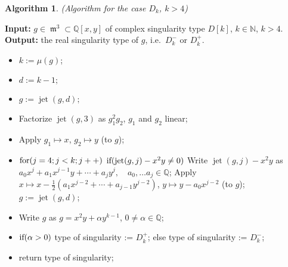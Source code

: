 \documentclass{amsproc}
\DeclareMathOperator{\m}{\mathfrak{m}}
\DeclareMathOperator{\jt}{jet}
\begin{document}
\newtheorem{D[k]k>4}[kjet]{Algorithm}
\begin{D[k]k>4}(Algorithm for the case $D_k$, $k>4$)
\end{D[k]k>4}
\noindent\textnormal{\bf Input:} $g\in \m^3\subset\mathbb Q[x,y]$ of complex
singularity type $D[k]$, $k\in\mathbb N$, $k>4$.\newline
\textnormal{\bf Output:} the real singularity type of $g$, i.e.~$D_k^-$
or $D_k^+$.
\begin{itemize}
\item $k:= \mu(g)$;
\item $d:=k-1;$
\item $g:=\jt(g,d);$
\item Factorize $\jt(g,3)$ as $g_1^2g_2$, $g_1$ and $g_2$ linear;
\item Apply $g_1\mapsto x$, $g_2\mapsto y$ (to $g$);
\item $\textnormal{for}(j=4; j<k; j++)$\newline
\phantom{}\quad $\textnormal{if}(\jt(g,j)-x^2y\neq0)$\newline
\phantom{}\quad\quad Write $\jt(g,j)-x^2y$ as
$a_0x^j+a_1x^{j-1}y+\cdots +a_jy^j,\quad a_0,\ldots a_j\in\mathbb Q$;\newline
\phantom{}\quad\quad Apply $x\mapsto x-\frac{1}{2}(a_1x^{j-2}+\cdots
+a_{j-1}y^{j-2})$, $y\mapsto y-a_0x^{j-2}$ (to $g$);\newline
\phantom{}\quad\quad $g:=\jt(g,d)$;\newline
\item Write $g$ as $g=x^2y+\alpha y^{k-1}$, $0\neq\alpha\in\mathbb Q$;
\item $\textnormal{if}(\alpha>0)$\newline
\phantom{}\quad type of singularity := $D_k^+$;\newline
else\newline
\phantom{}\quad type of singularity := $D_k^-$;
\item return type of singularity;
\end{itemize}
\end{document}
